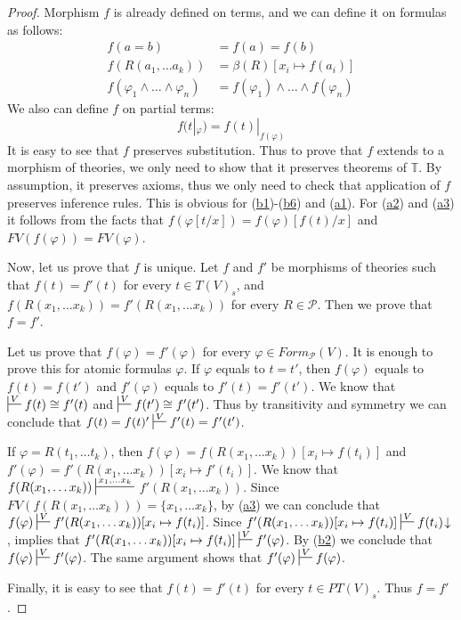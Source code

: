 \documentclass[reqno]{amsart}
\newcommand{\axref}[1]{(\hyperref[ax:#1]{#1})}
\theoremstyle{definition}
\theoremstyle{remark}
\numberwithin{figure}{section}
\begin{document}
\begin{proof}
Morphism $f$ is already defined on terms, and we can define it on formulas as follows:
\begin{align*}
f(a = b) & = f(a) = f(b) \\
f(R(a_1, \ldots a_k)) & = \beta(R)[x_i \mapsto f(a_i)] \\
f(\varphi_1 \land \ldots \land \varphi_n) & = f(\varphi_1) \land \ldots \land f(\varphi_n)
\end{align*}
We also can define $f$ on partial terms:
\[ f(t|_\varphi) = f(t)|_{f(\varphi)} \]
It is easy to see that $f$ preserves substitution.
Thus to prove that $f$ extends to a morphism of theories, we only need to show that it preserves theorems of $\mathbb{T}$.
By assumption, it preserves axioms, thus we only need to check that application of $f$ preserves inference rules.
This is obvious for \axref{b1}-\axref{b6} and \axref{a1}.
For \axref{a2} and \axref{a3} it follows from the facts that $f(\varphi[t/x]) = f(\varphi)[f(t)/x]$ and $FV(f(\varphi)) = FV(\varphi)$.

Now, let us prove that $f$ is unique.
Let $f$ and $f'$ be morphisms of theories such that $f(t) = f'(t)$ for every $t \in T(V)_s$, and
    $f(R(x_1, \ldots x_k)) = f'(R(x_1, \ldots x_k))$ for every $R \in \mathcal{P}$.
Then we prove that $f = f'$.

Let us prove that $f(\varphi) = f'(\varphi)$ for every $\varphi \in Form_\mathcal{P}(V)$.
It is enough to prove this for atomic formulas $\varphi$.
If $\varphi$ equals to $t = t'$, then $f(\varphi)$ equals to $f(t) = f(t')$ and $f'(\varphi)$ equals to $f'(t) = f'(t')$.
We know that $\sststile{}{V} f(t) \cong f'(t)$ and $\sststile{}{V} f(t') \cong f'(t')$.
Thus by transitivity and symmetry we can conclude that $f(t) = f(t)' \sststile{}{V} f'(t) = f'(t')$.

If $\varphi = R(t_1, \ldots t_k)$, then $f(\varphi) = f(R(x_1, \ldots x_k))[x_i \mapsto f(t_i)]$
    and $f'(\varphi) = f'(R(x_1, \ldots x_k))[x_i \mapsto f'(t_i)]$.
We know that $f(R(x_1, \ldots x_k)) \sststile{}{x_1, \ldots x_k}$ \linebreak $f'(R(x_1, \ldots x_k))$.
Since $FV(f(R(x_1, \ldots x_k))) = \{ x_1, \ldots x_k \}$, by \axref{a3} we can conclude that $f(\varphi) \sststile{}{V} f'(R(x_1, \ldots x_k))[x_i \mapsto f(t_i)]$.
Since $f'(R(x_1, \ldots x_k))[x_i \mapsto f(t_i)] \sststile{}{V} f(t_i)\!\downarrow$,  implies that
    $f'(R(x_1, \ldots x_k))[x_i \mapsto f(t_i)] \sststile{}{V} f'(\varphi)$.
By \axref{b2} we conclude that $f(\varphi) \sststile{}{V} f'(\varphi)$.
The same argument shows that $f'(\varphi) \sststile{}{V} f(\varphi)$.

Finally, it is easy to see that $f(t) = f'(t)$ for every $t \in PT(V)_s$.
Thus $f = f'$.
\end{proof}
\end{document}
